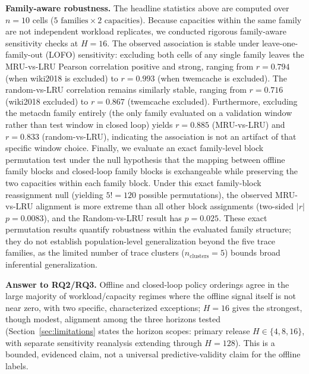 \textbf{Family-aware robustness.} The headline statistics above are computed
over $n=10$ cells ($5\text{ families} \times 2\text{ capacities}$). Because
capacities within the same family are not independent workload replicates, we
conducted rigorous family-aware sensitivity checks at $H=16$. The observed
association is stable under leave-one-family-out (LOFO) sensitivity: excluding both
cells of any single family leaves the MRU-vs-LRU Pearson correlation positive and
strong, ranging from $r=0.794$ (when wiki2018 is excluded) to $r=0.993$ (when
twemcache is excluded). The random-vs-LRU correlation remains similarly stable,
ranging from $r=0.716$ (wiki2018 excluded) to $r=0.867$ (twemcache excluded).
Furthermore, excluding the metacdn family entirely (the only family evaluated on
a validation window rather than test window in closed loop) yields $r=0.885$
(MRU-vs-LRU) and $r=0.833$ (random-vs-LRU), indicating the association is not
an artifact of that specific window choice. Finally, we evaluate an exact
family-level block permutation test under the null hypothesis that the mapping
between offline family blocks and closed-loop family blocks is exchangeable while
preserving the two capacities within each family block. Under this exact family-block
reassignment null (yielding $5!=120$ possible permutations), the observed
MRU-vs-LRU alignment is more extreme than all other block assignments (two-sided
$|r|$ $p=0.0083$), and the Random-vs-LRU result has $p=0.025$. These exact
permutation results quantify robustness within the evaluated family structure;
they do not establish population-level generalization beyond the five trace families,
as the limited number of trace clusters ($n_{\text{clusters}}=5$) bounds broad
inferential generalization.

\textbf{Answer to RQ2/RQ3.} Offline and closed-loop policy orderings agree
in the large majority of workload/capacity regimes where the offline
signal itself is not near zero, with two specific, characterized
exceptions; $H=16$ gives the strongest, though modest, alignment among the
three horizons tested (Section~\ref{sec:limitations} states the horizon
scopes: primary release $H\in\{4,8,16\}$, with separate sensitivity reanalysis extending through $H=128$). This is a
bounded, evidenced claim, not a universal predictive-validity claim for
the offline labels.
